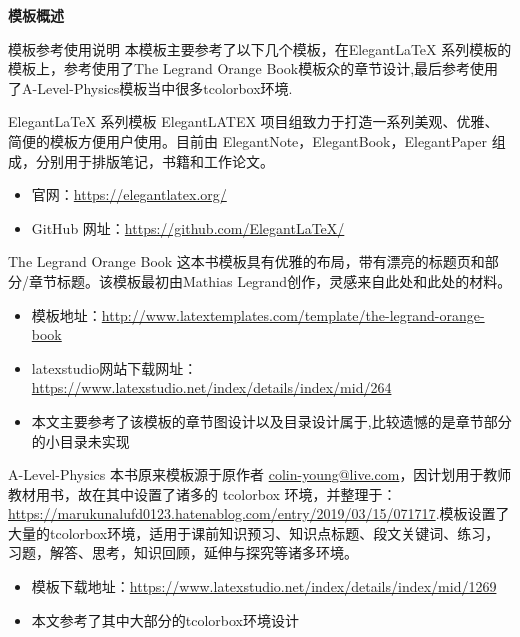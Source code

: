 
\myemptypage

\frontmatter
\begin{center}
	\textbf{\LARGE 模板概述}
\end{center}
\begin{ascolorbox5}{模板参考使用说明}
本模板主要参考了以下几个模板，在Elegant\LaTeX{} 系列模板的模板上，参考使用了The Legrand Orange Book模板众的章节设计,最后参考使用了A-Level-Physics模板当中很多tcolorbox环境.
\begin{ascboxB}{Elegant\LaTeX{} 系列模板}
ElegantLATEX 项目组致力于打造一系列美观、优雅、简便的模板方便用户使用。目前由
ElegantNote，ElegantBook，ElegantPaper 组成，分别用于排版笔记，书籍和工作论文。
\begin{itemize}
	\item 官网：\href{https://elegantlatex.org/}{https://elegantlatex.org/}
	\item GitHub 网址：\href{https://github.com/ElegantLaTeX/}{https://github.com/ElegantLaTeX/}
\end{itemize} 
\end{ascboxB}
\begin{ascboxB}{The Legrand Orange Book}
这本书模板具有优雅的布局，带有漂亮的标题页和部分/章节标题。该模板最初由Mathias Legrand创作，灵感来自此处和此处的材料。
\begin{itemize}
\item  模板地址：\href{http://www.latextemplates.com/template/the-legrand-orange-book}{http://www.latextemplates.com/template/the-legrand-orange-book}
\item  latexstudio网站下载网址：\href{https://www.latexstudio.net/index/details/index/mid/264}{https://www.latexstudio.net/index/details/index/mid/264}
\item 本文主要参考了该模板的章节图设计以及目录设计属于,比较遗憾的是章节部分的小目录未实现
\end{itemize} 
\end{ascboxB}
\begin{ascboxB}{A-Level-Physics}
本书原来模板源于原作者  \url{colin-young@live.com}，因计划用于教师教材用书，故在其中设置了诸多的 tcolorbox 环境，并整理于：\url{https://marukunalufd0123.hatenablog.com/entry/2019/03/15/071717}.模板设置了大量的tcolorbox环境，适用于课前知识预习、知识点标题、段文关键词、练习，习题，解答、思考，知识回顾，延伸与探究等诸多环境。
\begin{itemize}
	\item 模板下载地址：\href{https://www.latexstudio.net/index/details/index/mid/1269}{https://www.latexstudio.net/index/details/index/mid/1269}
	\item 本文参考了其中大部分的tcolorbox环境设计
\end{itemize} 	
\end{ascboxB}

\end{ascolorbox5}

